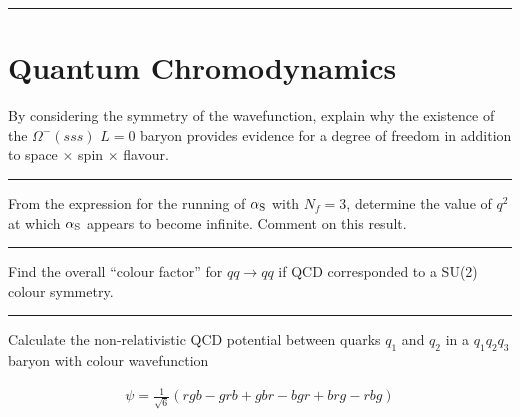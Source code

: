 
\noindent\rule{7in}{2.8pt}
\section{Quantum Chromodynamics}
    
\begin{problem}{10.1}
By considering the symmetry of the wavefunction, explain why the existence of the $\Omega^−(sss)$ $L = 0$ baryon provides evidence for a degree of freedom in addition to space $\times$ spin $\times$ flavour.
\end{problem}
\begin{solution}

\end{solution}

\noindent\rule{7in}{1.5pt}


\begin{problem}{10.2}
From the expression for the running of $\alpha_\text{S}$ with $N_f = 3$, determine the value of $q^2$ at which $\alpha_\text{S}$ appears to become infinite. Comment on this result.
\end{problem}
\begin{solution}

\end{solution}

\noindent\rule{7in}{1.5pt}


\begin{problem}{10.3}
Find the overall “colour factor” for $qq \to qq$ if QCD corresponded to a SU(2) colour symmetry.
\end{problem}
\begin{solution}

\end{solution}

\noindent\rule{7in}{1.5pt}


\begin{problem}{10.4}
Calculate the non-relativistic QCD potential between quarks $q_1$ and $q_2$ in a $q_1q_2q_3$ baryon with colour wavefunction

\begin{align*}
    \psi = \frac{1}{\sqrt{6}} \left(  rgb-grb+gbr-bgr  +brg - rbg\right)
\end{align*}\\
\end{problem}
\begin{solution}

\end{solution}

